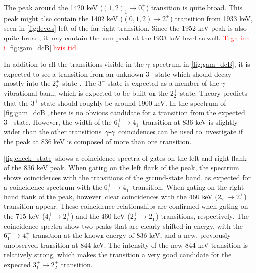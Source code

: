\documentclass[twoside,english]{uiofysmaster/uiofysmaster}
\newcommand{\ga}{$\gamma$}
\let\orgautoref\autoref
\renewcommand{\autoref}
        {%
		 \def\sectionautorefname{Section}%
		 \def\subsectionautorefname{Section}%
		 \def\subsubsectionautorefname{Section}%
		 \def\chapterautorefname{Chapter}%
          \orgautoref}
\begin{document}
The peak around the 1420 keV ($(1,2)_1 \rightarrow 0_1^+$) transition is quite broad. 
This peak might also contain the 1402 keV ($(0,1,2) \rightarrow 2_1^+$) transition from 1933 keV, seen in \autoref{fig:levels} left of the far right transition. 
Since the 1952 keV peak is also quite broad, it may contain the sum-peak at the 1933 keV level as well. \textcolor{red}{Tegn inn i \autoref{fig:gam_dcB} hvis tid.}

In addition to all the transitions visible in the \ga\ spectrum in \autoref{fig:gam_dcB}, it is expected to see a transition from an unknown $3^+$ state which should decay mostly into the $2_2^+$ state \cite{Klintefjord2016, Samorajczyk2015}.
The $3^+$ state is expected as a member of the \ga-vibrational band, which is expected to be built on the $2_2^+$ state.
Theory predicts that the $3^+$ state should roughly be around 1900 keV.
In the spectrum of \autoref{fig:gam_dcB}, there is no obvious candidate for a transition from the expected $3^+$ state.
However, the width of the $6_1^+ \rightarrow 4_1^+$ transition at 836 keV is slightly wider than the other transitions. 
\ga-\ga\ coincidences can be used to investigate if the peak at 836 keV is composed of more than one transition. 

\autoref{fig:check_state} shows a coincidence spectra of gates on the left and right flank of the 836 keV peak.
When gating on the left flank of the peak, the spectrum shows coincidences with the transitions of the ground-state band, as expected for a coincidence spectrum with the $6_1^+ \rightarrow 4_1^+$ transition. 
When gating on the right-hand flank of the peak, however, clear coincidences with the 460 keV ($2_2^+ \rightarrow 2_1^+$) transition appear. 
These coincidence relationships are confirmed when gating on the 715 keV ($4_1^+ \rightarrow 2_1^+$) and the 460 keV ($2_2^+ \rightarrow 2_1^+$) transitions, respectively. 
The coincidence spectra show two peaks that are clearly shifted in energy, with the $6_1^+ \rightarrow 4_1^+$ transition at the known energy of 836 keV, and a new, previously unobserved transition at 844 keV. 
The intensity of the new 844 keV transition is relatively strong, which makes the transition a very good candidate for the expected $3_1^+ \rightarrow 2_2^+$ transition. 
\end{document}
